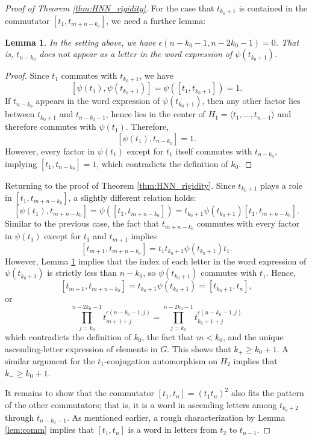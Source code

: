\documentclass[10pt,a4paper]{amsart}
\newtheorem{lem}{Lemma}
\begin{document}
\begin{proof}[Proof of Theorem \ref{thm:HNN_rigidity}]
    For the case that $t_{k_0+1}$ is contained in the commutator $[t_1,t_{m+n-k_0}]$, we need a further lemma:
    \begin{lem}\label{lem:not_contain}
        In the setting above, we have $\epsilon(n-k_0-1, n-2k_0-1) = 0$. That is, $t_{n-k_0}$ does not appear as a letter in the word expression of $\psi(t_{k_0+1})$. 
    \end{lem}
    \begin{proof}
        Since $t_1$ commutes with $t_{k_0+1}$, we have
        \[
            [\psi(t_1),\psi(t_{k_0+1})] = \psi([t_1,t_{k_0+1}]) = 1.
        \]
        If $t_{n-k_0}$ appears in the word expression of $\psi(t_{k_0+1})$, then any other factor lies between $t_{k_0+1}$ and $t_{n-k_0-1}$, hence lies in the center of $H_1 = \langle t_1,\dots, t_{n-1}\rangle$ and therefore commutes with $\psi(t_1)$. Therefore,
        \[
        [\psi(t_1),t_{n-k_0}] = 1.
        \]
        However, every factor in $\psi(t_1)$ except for $t_1$ itself commutes with $t_{n-k_0}$, implying $[t_1,t_{n-k_0}] = 1$, which contradicts the definition of $k_0$.
    \end{proof}
    Returning to the proof of Theorem \ref{thm:HNN_rigidity}. Since $t_{k_0+1}$ plays a role in $[t_1,t_{m+n-k_0}]$, a slightly different relation holds:
    \[
        [\psi(t_1),t_{m+n-k_0}] = \psi([t_1,t_{m+n-k_0}]) = t_{k_0+1}\psi(t_{k_0+1})[t_1,t_{m+n-k_0}].
    \]
    Similar to the previous case, the fact that $t_{m+n-k_0}$ commutes with every factor in $\psi(t_1)$ except for $t_1$ and $t_{m+1}$ implies
    \[
        [t_{m+1},t_{m+n-k_0}] = t_1t_{k_0+1}\psi(t_{k_0+1})t_1.
    \]
    However, Lemma \ref{lem:not_contain} implies that the index of each letter in the word expression of $\psi(t_{k_0+1})$ is strictly less than $n-k_0$, so $\psi(t_{k_0+1})$ commutes with $t_1$. Hence,
    \[
    [t_{m+1},t_{m+n-k_0}] = t_{k_0+1}\psi(t_{k_0+1}) = [t_{k_0+1},t_n],
    \]
    or
    \[
    \prod_{j=k_0}^{n-2k_0-1}t_{m+1+j}^{\epsilon(n-k_0-1,j)} = \prod_{j=k_0}^{n-2k_0-1}t_{k_0+1+j}^{\epsilon(n-k_0-1,j)}
    \]
    which contradicts the definition of $k_0$, the fact that $m<k_0$, and the unique ascending-letter expression of elements in $G$. This shows that $k_+\geq k_0+1$. A similar argument for the $t_1$-conjugation automorphism on $H_2$ implies that $k_-\geq k_0+1$.
    
    It remains to show that the commutator $[t_1,t_n] = (t_1t_n)^2$ also fits the pattern of the other commutators; that is, it is a word in ascending letters among $t_{k_0+2}$ through $t_{n-k_0-1}$. As mentioned earlier, a rough characterization by Lemma \ref{lem:comm} implies that $[t_1,t_n]$ is a word in letters from $t_2$ to $t_{n-1}$.


\end{proof}
\end{document}
